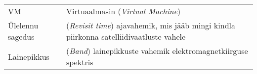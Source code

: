 \begin{longtable}{p{3cm}p{10cm}}  %
VM & Virtuaalmasin (\textit{Virtual Machine})\\
Ülelennu sagedus & (\textit{Revisit time}) ajavahemik, mis jääb mingi kindla
piirkonna satelliidivaatluste vahele\\
Lainepikkus & (\textit{Band}) lainepikkuste vahemik elektromagnetkiirguse spektris \\
\end{longtable}
\addtocounter{table}{-1} %